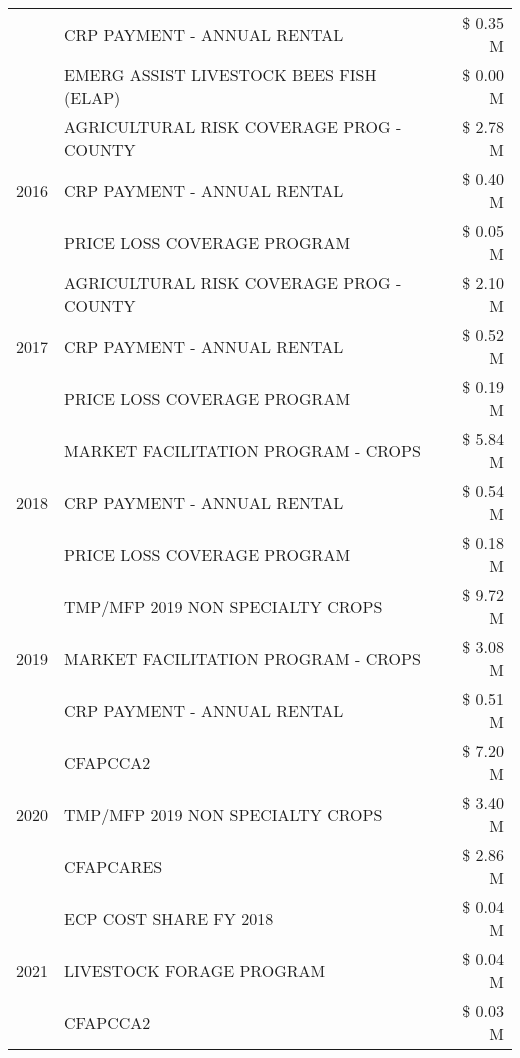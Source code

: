\begin{tabular}{llr}
 & CRP PAYMENT - ANNUAL RENTAL & \$ 0.35 M \\
 & EMERG ASSIST LIVESTOCK BEES FISH (ELAP) & \$ 0.00 M \\
\cline{1-3}
\multirow[t]{3}{*}{2016} & AGRICULTURAL RISK COVERAGE PROG - COUNTY & \$ 2.78 M \\
 & CRP PAYMENT - ANNUAL RENTAL & \$ 0.40 M \\
 & PRICE LOSS COVERAGE PROGRAM & \$ 0.05 M \\
\cline{1-3}
\multirow[t]{3}{*}{2017} & AGRICULTURAL RISK COVERAGE PROG - COUNTY & \$ 2.10 M \\
 & CRP PAYMENT - ANNUAL RENTAL & \$ 0.52 M \\
 & PRICE LOSS COVERAGE PROGRAM & \$ 0.19 M \\
\cline{1-3}
\multirow[t]{3}{*}{2018} & MARKET FACILITATION PROGRAM - CROPS & \$ 5.84 M \\
 & CRP PAYMENT - ANNUAL RENTAL & \$ 0.54 M \\
 & PRICE LOSS COVERAGE PROGRAM & \$ 0.18 M \\
\cline{1-3}
\multirow[t]{3}{*}{2019} & TMP/MFP 2019 NON SPECIALTY CROPS & \$ 9.72 M \\
 & MARKET FACILITATION PROGRAM - CROPS & \$ 3.08 M \\
 & CRP PAYMENT - ANNUAL RENTAL & \$ 0.51 M \\
\cline{1-3}
\multirow[t]{3}{*}{2020} & CFAPCCA2 & \$ 7.20 M \\
 & TMP/MFP 2019 NON SPECIALTY CROPS & \$ 3.40 M \\
 & CFAPCARES & \$ 2.86 M \\
\cline{1-3}
\multirow[t]{3}{*}{2021} & ECP COST SHARE FY 2018 & \$ 0.04 M \\
 & LIVESTOCK FORAGE PROGRAM & \$ 0.04 M \\
 & CFAPCCA2 & \$ 0.03 M \\
\cline{1-3}
\bottomrule
\end{tabular}

